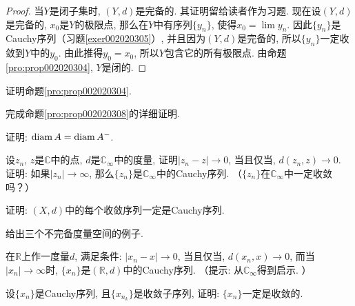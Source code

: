 \begin{proof}
当$Y$是闭子集时, $(Y, d)$是完备的. 其证明留给读者作为习题. 现在设$(Y, d)$是完备的, $x_0$是$Y$的极限点, 那么在$Y$中有序列$\{y_n\}$, 使得$x_0 = \lim{y_n}$. 因此$\{y_n\}$是Cauchy序列（习题\ref{exer002020305}）, 并且因为$(Y, d)$是完备的, 所以$\{y_n\}$一定收敛到$Y$中的$y_0$. 由此推得$y_0 = x_0$, 所以$Y$包含它的所有极限点. 由命题\ref{pro:prop002020304}, $Y$是闭的. 
\end{proof}

\begin{exercise}
证明命题\ref{pro:prop002020304}. 
\end{exercise}

\begin{exercise}
完成命题\ref{pro:prop002020308}的详细证明. 
\end{exercise}

\begin{exercise}\label{exer002020303}
证明: $\operatorname{diam}{A} = \operatorname{diam}{A^-}$. 
\end{exercise}

\begin{exercise}\label{exer002020304}
设$z_n$, $z$是$\mathbb{C}$中的点, $d$是$\mathbb{C}_{\infty}$中的度量, 证明$|z_n - z| \to 0$, 当且仅当, $d(z_n, z) \to 0$. 证明: 如果$|z_n| \to \infty$, 那么$\{z_n\}$是$\mathbb{C}_{\infty}$中的Cauchy序列. （$\{z_n\}$在$\mathbb{C}_{\infty}$中一定收敛吗？）
\end{exercise}

\begin{exercise}\label{exer002020305}
证明: $(X, d)$中的每个收敛序列一定是Cauchy序列. 
\end{exercise}

\begin{exercise}\label{exer002020306}
给出三个不完备度量空间的例子. 
\end{exercise}

\begin{exercise}\label{exer002020307}
在$\mathbb{R}$上作一度量$d$, 满足条件: $|x_n - x| \to 0$, 当且仅当, $d(x_n, x) \to 0$, 而当$|x_n| \to \infty$时, $\{x_n\}$是$(\mathbb{R}, d)$中的Cauchy序列. （提示: 从$\mathbb{C}_{\infty}$得到启示. ）
\end{exercise}

\begin{exercise}\label{exer002020308}
设$\{x_n\}$是Cauchy序列, 且$\{x_{n_k}\}$是收敛子序列, 证明: $\{x_n\}$一定是收敛的. 
\end{exercise}



